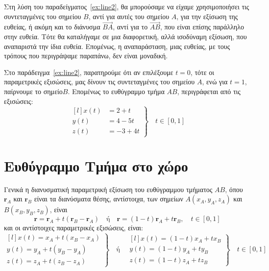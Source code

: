 \begin{rem}
  Στη λύση του παραδείγματος~\ref{ex:line2}, θα μπορούσαμε να είχαμε χρησιμοποιήσει 
  τις συντεταγμένες του σημείου $ B $, αντί για αυτές του σημείου $A$, για την εξίσωση 
  της ευθείας, ή ακόμη και το διάνυσμα $ \vec{BA} $, αντί για το $ \vec{AB} $, που 
  είναι επίσης παράλληλο στην ευθεία. Τότε θα καταλήγαμε σε μια διαφορετική, αλλά 
  ισοδύναμη εξίσωση, που αναπαριστά την ίδια ευθεία. Επομένως, η αναπαράσταση, μιας 
  ευθείας, με τους τρόπους που περιγράψαμε παραπάνω, δεν είναι μοναδική.
\end{rem}
\begin{rem}
  Στο παράδειγμα~\ref{ex:line2}, παρατηρούμε ότι αν επιλέξουμε $ t=0 $, τότε οι 
  παραμετρικές εξισώσεις, μας δίνουν τις συντεταγμένες του σημείου $ A $, ενώ για 
  $ t=1 $, παίρνουμε το σημείο$ B $. Επομένως το ευθύγραμμο τμήμα $ AB $, 
  περιγράφεται από τις εξισώσεις:
  \[
    \left.
      \begin{matrix*}[l]
        x(t) &= 2+t \\
        y(t) &= 4-5t \\
        z(t) &= -3+4t
      \end{matrix*} 
    \right\} \quad  t \in [0,1]
  \]


  \section*{Ευθύγραμμο Τμήμα στο χώρο}

  Γενικά η διανυσματική παραμετρική εξίσωση του ευθύγραμμου τμήματος $ AB $, όπου
  $ \mathbf{r}_{A} $ και $ \mathbf{r}_{B} $ είναι τα διανύσματα θέσης, αντίστοιχα, των 
  σημείων $ A(x_{A},y_{A},z_{A}) $ και $B(x_{B},y_{B},z_{B})$, είναι 
  \[
    \boxed{\mathbf{r} = \mathbf{r}_{A} + t(\mathbf{r}_{B}- \mathbf{r}_{A})} 
    \quad \text{ή} \quad \boxed{\mathbf{r} = (1-t) \mathbf{r}_{A} + t \mathbf{r}_{B}}, 
    \quad t \in [0,1]
  \] 
  και οι αντίστοιχες παραμετρικές εξισώσεις, είναι:
  \[
    \boxed{\left.
      \begin{matrix*}[l]
        x(t) = x_{A} + t(x_{B}-x_{A}) \\
        y(t) = y_{A} + t(y_{B}-y_{A}) \\
        z(t) = z_{A} + t(z_{B}-z_{A}) 
      \end{matrix*} 
  \right\}} \quad \text{ή} \quad  
  \boxed{\left.
      \begin{matrix*}[l]
        x(t) = (1-t)x_{A} + tx_{B} \\
        y(t) = (1-t)y_{A} + ty_{B} \\
        z(t) = (1-t)z_{A} + tz_{B} 
      \end{matrix*} 
  \right\}} \quad t \in [0,1]
  \]
\end{rem}

